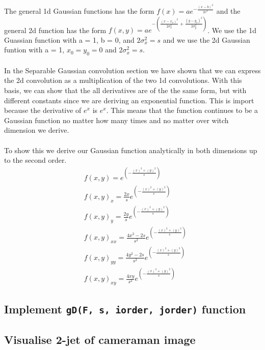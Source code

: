 \documentclass[abstract=true]{scrartcl}
\begin{document}
    The general 1d Gaussian functions has the form 
    $ f(x) = a e^{- { \frac{(x-b)^2 }{ 2 c^2} } } $ 
    and the general 2d function has the form 
    $ f(x,y) = a e^{- \left(\frac{(x-x_o)^2}{2\sigma_x^2} + \frac{(y-y_o)^2}{2\sigma_y^2} \right)} $. 
    We use the 1d Guassian function with a = 1, b = 0, and $ 2\sigma_x^2 = s $ and
    we use the 2d Gaussian funtion with a = 1, $ x_0 = y_0 = 0 $ and $ 2\sigma_x^2 = s $.\\
    \\
    In the Separable Gaussian convolution section we have shown that we can express the
    2d convolution as a multiplication of the two 1d convolutions. With this 
    basis, we can show that the all derivatives are of the the 
    same form, but with different constants since we are deriving an exponential
    function. This is import because the derivative of $e^x$ is $e^x$. This 
    means that the function continues to be a Gaussian function no matter how
    many times and no matter over witch dimension we derive. \\
    \\
    To show this we derive our Gaussian function analytically in both dimensions 
    up to the second order.\\
    \begin{align*}
    &f(x,y)   =  e^{ (-\frac{(x)^2 +(y)^2}{s})} \\
    &f(x,y)_x =  \frac{2x}{s} e^{ (-\frac{(x)^2 +(y)^2}{s})} \\
    &f(x,y)_y = \frac{2y}{s} e^{ ( -\frac{(x)^2 +(y)^2}{s})} \\
    &f(x,y)_{xx} =  \frac{4x^2-2s}{s^2} e^{ (-\frac{(x)^2 +(y)^2}{s})} \\
    &f(x,y)_{yy} =  \frac{4y^2-2s}{s^2} e^{ (-\frac{(x)^2 +(y)^2}{s})} \\
    &f(x,y)_{xy} =  \frac{4xy}{s^2} e^{ (-\frac{(x)^2 +(y)^2}{s})}
    \end{align*}
    
    

    \subsection{Implement \texttt{gD(F, s, iorder, jorder)} function}

    \subsection{Visualise 2-jet of cameraman image}
\end{document}
